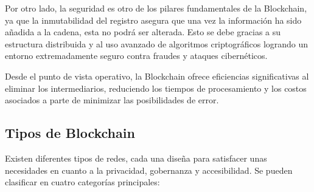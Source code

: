 Por otro lado, la seguridad es otro de los pilares fundamentales de la Blockchain, ya que la inmutabilidad del registro asegura que una vez la información ha sido añadida a la cadena, esta no podrá ser alterada. Esto se debe gracias a su estructura distribuida y al uso avanzado de algoritmos criptográficos logrando un entorno extremadamente seguro contra fraudes y ataques cibernéticos.

Desde el punto de vista operativo, la Blockchain ofrece eficiencias significativas al eliminar los intermediarios, reduciendo los tiempos de procesamiento y los costos asociados a parte de minimizar las posibilidades de error.


\subsection{Tipos de Blockchain}

Existen diferentes tipos de redes, cada una diseña para satisfacer unas necesidades en cuanto a la privacidad, gobernanza y accesibilidad. 
Se pueden clasificar en cuatro categorías principales:

